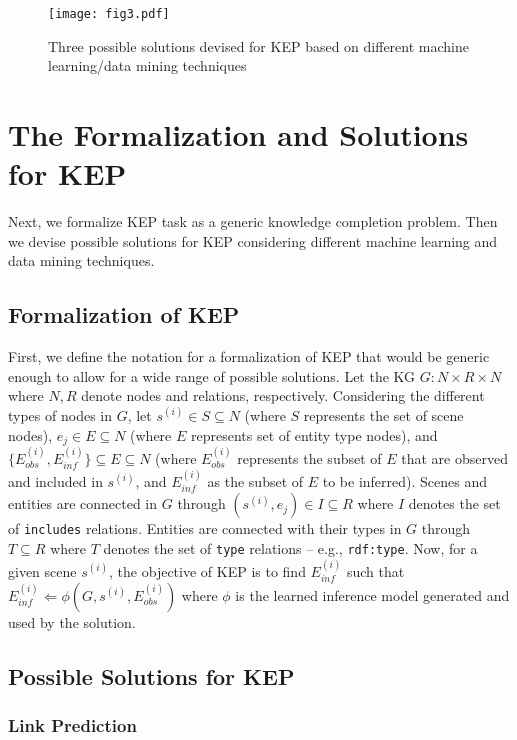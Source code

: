 \documentclass[conference]{IEEEtran}
\begin{document}
\begin{figure*}[ht]
    \centering
    \texttt{[image: fig3.pdf]}
    \caption{Three possible solutions devised for KEP based on different machine learning/data mining techniques}
    \label{fig:kep_solutions}
\end{figure*}


\section{The Formalization and Solutions for KEP}
\label{sec:formalization}

Next, we formalize KEP task as a generic knowledge completion problem. Then we devise possible solutions for KEP considering different machine learning and data mining techniques. 

\subsection{Formalization of KEP}
First, we define the notation for a formalization of KEP that would be generic enough to allow for a wide range of possible solutions. Let the KG $G: N\times R \times N$ where $N, R$ denote nodes and relations, respectively. Considering the different types of nodes in $G$, let $s^{(i)} \in S \subseteq N$ (where $S$ represents the set of scene nodes), $e_j \in E \subseteq N$ (where $E$ represents set of entity type nodes), and $\{E^{(i)}_{obs}, E^{(i)}_{inf}\} \subseteq  E \subseteq N$ (where $E^{(i)}_{obs}$ represents the subset of $E$ that are observed and included in $s^{(i)}$, and $E^{(i)}_{inf}$ as the subset of $E$ to be inferred). Scenes and entities are connected in $G$ through $(s^{(i)}, e_j) \in I \subseteq R$ where $I$ denotes the set of \texttt{includes} relations. Entities are connected with their types in $G$ through $T \subseteq R$ where $T$ denotes the set of \texttt{type} relations  -- e.g., \texttt{rdf:type}. Now, for a given scene $s^{(i)}$, the objective of KEP is to find  $E^{(i)}_{inf}$ such that  $E^{(i)}_{inf}  \Leftarrow \phi (G, s^{(i)}, E^{(i)}_{obs})$ where $\phi$ is the learned inference model generated and used by the solution.

\subsection{Possible Solutions for KEP}
\subsubsection{\textbf{Link Prediction}}
\end{document}

